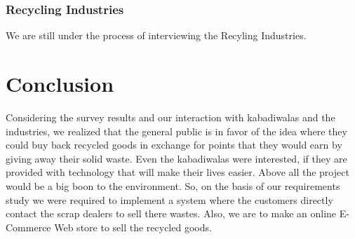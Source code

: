\documentclass{article}
\begin{document}
\subsubsection{Recycling Industries}
We are still under the process of interviewing the Recyling Industries.


\section{Conclusion}
\par Considering the survey results and our interaction with kabadiwalas and the industries, we realized that the general public is in favor of the idea where they could buy back recycled goods in exchange for points that they would earn by giving away their solid waste. Even the kabadiwalas were interested, if they are provided with technology that will make their lives easier. Above all the project would be a big boon to the environment. So, on the basis of our requirements study we were required to implement a system where the customers directly contact the scrap dealers to sell there wastes. Also, we are to make an online E-Commerce Web store to sell the recycled goods.
\end{document}
